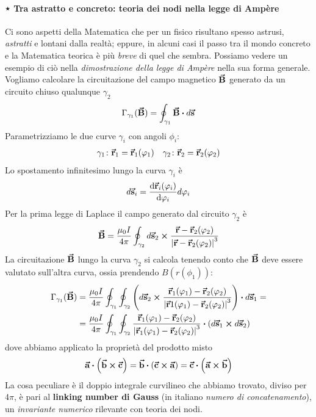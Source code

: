 \paragraph{⋆ Tra astratto e concreto: teoria dei nodi nella legge di Ampère}
Ci sono aspetti della Matematica che per un fisico risultano spesso astrusi, \textit{astratti} e lontani dalla realtà; eppure, in alcuni casi il passo tra il mondo concreto e la Matematica teorica è più \textit{breve} di quel che sembra. Possiamo vedere un esempio di ciò nella \textit{dimostrazione della legge di Ampère} nella sua forma generale.\\
Vogliamo calcolare la circuitazione del campo magnetico $\vb*{\va{B}}$ generato da un circuito chiuso qualunque $\gamma_2$ 
\begin{equation*}
	\Gamma_{\gamma_1}(\vba{B})=\oint_{\gamma_1}\vba{B}\vdot d\vba{s}
\end{equation*}
Parametrizziamo le due curve $\gamma_i$ con angoli $\phi_i$:
\begin{align*}
	\gamma_1\colon \vb*{\va{r}}_1=\vb*{\va{r}}_1(\varphi_1) && 
	\gamma_2\colon \vb*{\va{r}}_2=\vb*{\va{r}}_2(\varphi_2)
\end{align*}
Lo spostamento infinitesimo lungo la curva $\gamma_i$ è
\begin{equation*}
	d\vb*{\va{s}}_i=\dv{\vb*{\va{r}}_i(\varphi_i)}{\varphi_i}d\varphi_i
\end{equation*}
Per la prima legge di Laplace il campo generato dal circuito $\gamma_2$ è
\begin{equation*}
	\vb*{\va{B}}=\frac{\mu_0 I}{4\pi}\oint_{\gamma_2}d\vb*{\va{s}}_2\cross\frac{\vb*{\va{r}}-\vb*{\va{r}}_2(\varphi_2)}{\abs{\vb*{\va{r}}-\vb*{\va{r}}_2(\varphi_2)}^3}
\end{equation*}
La circuitazione $\vb*{\va{B}}$ lungo la curva $\gamma_2$ si calcola tenendo conto che $\vb*{\va{B}}$ deve essere valutato sull'altra curva, ossia prendendo $B(r(\phi_1))$: 
\begin{align*}
	\Gamma_{\gamma_1}(\vba{B})&=\frac{\mu_0 I}{4\pi}\oint_{\gamma_1} \oint_{\gamma_2} \left(d\vba{s}_2 \cross \frac{\vba{r}_1(\phi_1) - \vba{r}_2(\phi_2)}{\abs{\vba{r}1(\phi_1) - \vba{r}_2(\phi_2)}^3}\right) \vdot d\vba{s}_1=\\
	&=\frac{\mu_0 I}{4\pi}\oint_{\gamma_1} \oint_{\gamma_2} \frac{\vba{r}_1(\phi_1) - \vba{r}_2 (\phi_2)}{\abs{\vba{r}_1(\phi_1) - \vba{r}_2(\phi_2)}^3} \vdot \left(d\vba{s}_1\cross d\vba{s}_2\right)
\end{align*}
dove abbiamo applicato la proprietà del prodotto misto
\begin{equation*}
	\vba{a}\vdot\left(\vba{b}\cross\vba{c}\right)=
	\vba{b}\vdot\left(\vba{c}\cross\vba{a}\right)=
	\vba{c}\vdot\left(\vba{a}\cross\vba{b}\right)
\end{equation*}
La cosa peculiare è il doppio integrale curvilineo che abbiamo trovato, diviso per $4\pi$, è pari al \textbf{linking number di Gauss} (in italiano \textit{numero di concatenamento}), un \textit{invariante numerico} rilevante con teoria dei nodi.

